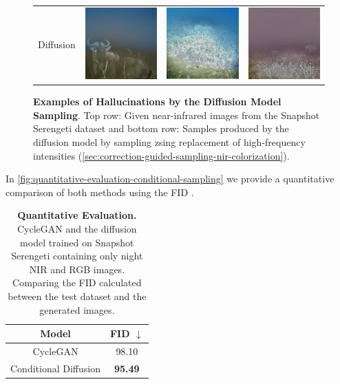 \begin{figure}
\begin{tabularx}{.6\textwidth}{>{\small}m{.03\linewidth} Y Y Y}
        \begin{sideways}Diffusion\end{sideways} & \includegraphics{gfx/conditional-diffusion-sampling-hallucinations-qual/diffusion_S2_C07_R3_PICT0462.png} & \includegraphics{gfx/conditional-diffusion-sampling-hallucinations-qual/diffusion_S2_G13_R1_PICT0332.png} & \includegraphics{gfx/conditional-diffusion-sampling-hallucinations-qual/diffusion_S2_T11_R2_PICT0208.png}
    \end{tabularx}
    \caption{
        \textbf{Examples of Hallucinations by the Diffusion Model Sampling}.
        Top row: Given near-infrared images from the Snapshot Serengeti dataset \parencite{serengeti}
        and bottom row: Samples produced by the diffusion model by sampling zsing replacement of high-frequency intensities (\autoref{sec:correction-guided-sampling-nir-colorization}).
    }
    \label{fig:qualitative-evaluation-conditional-sampling-hallucinations}
\end{figure}

In \autoref{fig:quantitative-evaluation-conditional-sampling} we provide a quantitative comparison of both methods using the FID \parencite{ttur}.

\begin{table}[htp!]
    \centering
    \begin{tabular}{c | c}
        Model                 & FID  $\downarrow$ \\
        \hline\hline
        CycleGAN              & 98.10             \\
        Conditional Diffusion & \textbf{95.49}
    \end{tabular}
    \caption{
        \textbf{Quantitative Evaluation.} CycleGAN and the diffusion model trained on Snapshot Serengeti \parencite{serengeti} containing only night NIR and RGB images.
        Comparing the FID calculated between the test dataset and the generated images.
    }
    \label{fig:quantitative-evaluation-conditional-sampling}
\end{table}

